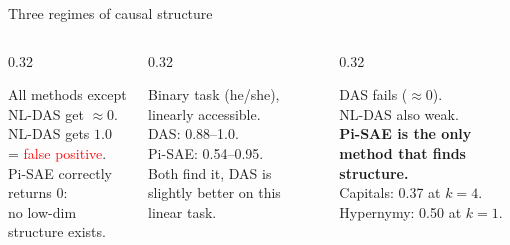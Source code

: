 \documentclass[aspectratio=169,11pt]{beamer}
\begin{document}
\begin{frame}{Three regimes of causal structure}
\vspace{-0.3em}

\begin{columns}[T]
\begin{column}{0.32\textwidth}

\vspace{0.3em}
{\scriptsize All methods except NL-DAS get $\approx 0$.\\[0.2em]
NL-DAS gets $1.0$ = \textcolor{red}{false positive}.\\[0.2em]
Pi-SAE correctly returns 0:\\no low-dim structure exists.}
\end{column}
\begin{column}{0.32\textwidth}

\vspace{0.3em}
{\scriptsize Binary task (he/she), linearly accessible.\\[0.2em]
DAS: 0.88--1.0.\\
Pi-SAE: 0.54--0.95.\\[0.2em]
Both find it, DAS is slightly better on this linear task.}
\end{column}
\begin{column}{0.32\textwidth}

\vspace{0.3em}
{\scriptsize DAS fails ($\approx 0$).\\
NL-DAS also weak.\\[0.2em]
\textbf{Pi-SAE is the only method that finds structure.}\\[0.2em]
Capitals: 0.37 at $k{=}4$.\\
Hypernymy: 0.50 at $k{=}1$.}
\end{column}
\end{columns}

\vspace{0.5em}
\centering
{}
\end{frame}
\end{document}
